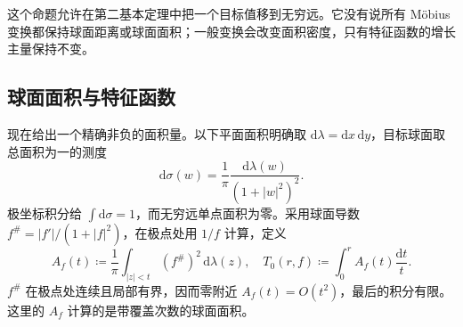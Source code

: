 这个命题允许在第二基本定理中把一个目标值移到无穷远。它没有说所有 Möbius 变换都保持球面距离或球面面积；一般变换会改变面积密度，只有特征函数的增长主量保持不变。

\subsection{球面面积与特征函数}
\label{b3:subsec:C0203}

现在给出一个精确非负的面积量。以下平面面积明确取 \(\mathrm{d}\lambda=\mathrm{d}x\,\mathrm{d}y\)，目标球面取总面积为一的测度
\[
 \mathrm{d}\sigma(w)=\frac1\pi\frac{\mathrm{d}\lambda(w)}{(1+|w|^2)^2}.
\]
极坐标积分给 \(\int\mathrm{d}\sigma=1\)，而无穷远单点面积为零。采用球面导数 \(f^\#=|f'|/(1+|f|^2)\)，在极点处用 \(1/f\) 计算，定义
\[
 A_f(t)\coloneqq\frac1\pi\int_{|z|<t}(f^\#)^2\,\mathrm{d}\lambda(z),
 \quad T_0(r,f)\coloneqq\int_0^r A_f(t)\frac{\mathrm{d}t}{t}.
\]
\(f^\#\) 在极点处连续且局部有界，因而零附近 \(A_f(t)=O(t^2)\)，最后的积分有限。这里的 \(A_f\) 计算的是带覆盖次数的球面面积。

